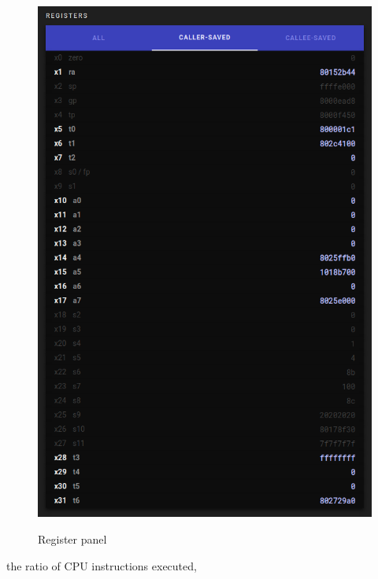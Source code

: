 \begin{figure}[H]
  \includegraphics[scale=.35]{reg}
  \label{fig:reg}
  \caption{Register panel}
  \centering
\end{figure}

\noindent
the ratio of CPU instructions executed,

